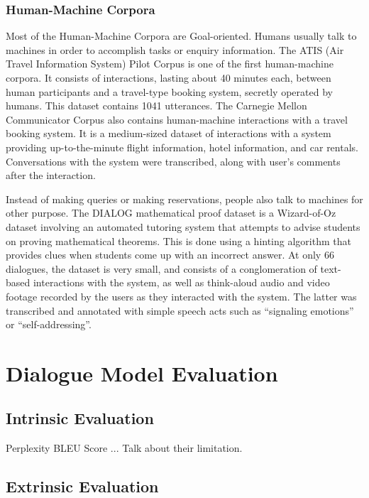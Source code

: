 \documentclass[bsc,frontabs,twoside,singlespacing,parskip,deptreport]{infthesis}     %
\begin{document}
\subsubsection{Human-Machine Corpora}

Most of the Human-Machine Corpora are Goal-oriented. Humans usually talk to machines in order to accomplish tasks or enquiry information. The ATIS (Air Travel Information System) Pilot Corpus\cite{hemphill1990atis} is one of the first human-machine corpora. It consists of interactions, lasting about 40 minutes each, between human participants and a travel-type booking system, secretly operated by humans. This dataset contains 1041 utterances. The Carnegie Mellon Communicator Corpus\cite{bennett2002carnegie} also contains human-machine interactions with a travel booking system. It is a medium-sized dataset of interactions with a system providing up-to-the-minute flight information, hotel information, and car rentals. Conversations 
with the system were transcribed, along with user’s comments after the interaction.

Instead of making queries or making reservations, people also talk to machines for other purpose. The DIALOG mathematical proof dataset\cite{wolska2004annotated} is a Wizard-of-Oz dataset involving an automated tutoring system that attempts to advise students on proving mathematical theorems. This is done using a hinting algorithm that provides clues when students come up with an incorrect answer. At only 66 dialogues, the dataset is very small, and consists of a conglomeration of text-based interactions with the system, as well as think-aloud audio and video footage recorded by the users as they interacted with the system. The latter was transcribed and annotated with simple speech acts such as “signaling emotions” or “self-addressing”.


\section{Dialogue Model Evaluation}

\subsection{Intrinsic Evaluation}
Perplexity
BLEU Score
...
Talk about their limitation.


\subsection{Extrinsic Evaluation}
\end{document}
